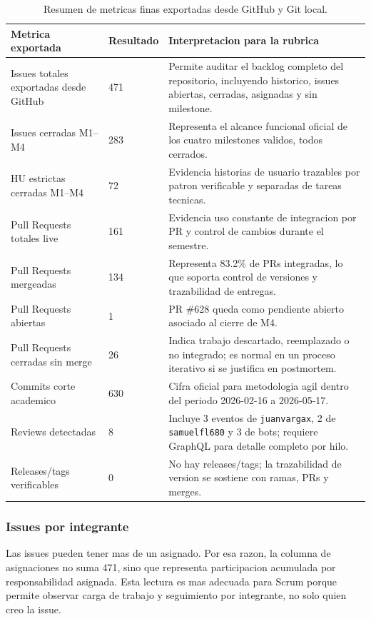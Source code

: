 \documentclass[11pt,a4paper]{article}
\begin{document}
\begin{table}[H]
\centering
\small
\begin{tabularx}{\linewidth}{P{4.2cm}P{3cm}Y}
\toprule
\textbf{Metrica exportada} & \textbf{Resultado} & \textbf{Interpretacion para la rubrica} \\
\midrule
Issues totales exportadas desde GitHub & 471 & Permite auditar el backlog completo del repositorio, incluyendo historico, issues abiertas, cerradas, asignadas y sin milestone. \\
Issues cerradas M1--M4 & 283 & Representa el alcance funcional oficial de los cuatro milestones validos, todos cerrados. \\
HU estrictas cerradas M1--M4 & 72 & Evidencia historias de usuario trazables por patron verificable y separadas de tareas tecnicas. \\
Pull Requests totales live & 161 & Evidencia uso constante de integracion por PR y control de cambios durante el semestre. \\
Pull Requests mergeadas & 134 & Representa 83.2\% de PRs integradas, lo que soporta control de versiones y trazabilidad de entregas. \\
Pull Requests abiertas & 1 & PR \#628 queda como pendiente abierto asociado al cierre de M4. \\
Pull Requests cerradas sin merge & 26 & Indica trabajo descartado, reemplazado o no integrado; es normal en un proceso iterativo si se justifica en postmortem. \\
Commits corte academico & 630 & Cifra oficial para metodologia agil dentro del periodo 2026-02-16 a 2026-05-17. \\
Reviews detectadas & 8 & Incluye 3 eventos de \texttt{juanvargax}, 2 de \texttt{samuelfl680} y 3 de bots; requiere GraphQL para detalle completo por hilo. \\
Releases/tags verificables & 0 & No hay releases/tags; la trazabilidad de version se sostiene con ramas, PRs y merges. \\
\bottomrule
\end{tabularx}
\caption{Resumen de metricas finas exportadas desde GitHub y Git local.}
\end{table}

\subsubsection{Issues por integrante}

Las issues pueden tener mas de un asignado. Por esa razon, la columna de asignaciones no suma 471, sino que representa participacion acumulada por responsabilidad asignada. Esta lectura es mas adecuada para Scrum porque permite observar carga de trabajo y seguimiento por integrante, no solo quien creo la issue.
\end{document}
